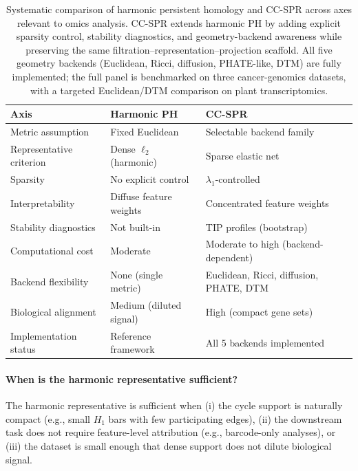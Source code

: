 \documentclass[11pt]{article}
\begin{document}
\begin{table}[h]
\centering
\small
\begin{tabular}{p{2.5cm}p{3.0cm}p{3.0cm}}
\toprule
\textbf{Axis} & \textbf{Harmonic PH} & \textbf{CC-SPR} \\
\midrule
Metric assumption & Fixed Euclidean & Selectable backend family \\
Representative criterion & Dense $\ell_2$ (harmonic) & Sparse elastic net \\
Sparsity & No explicit control & $\lambda_1$-controlled \\
Interpretability & Diffuse feature weights & Concentrated feature weights \\
Stability diagnostics & Not built-in & TIP profiles (bootstrap) \\
Computational cost & Moderate & Moderate to high (backend-dependent) \\
Backend flexibility & None (single metric) & Euclidean, Ricci, diffusion, PHATE, DTM \\
Biological alignment & Medium (diluted signal) & High (compact gene sets) \\
Implementation status & Reference framework & All 5 backends implemented \\
\bottomrule
\end{tabular}
\caption{Systematic comparison of harmonic persistent homology and CC-SPR across axes relevant to omics analysis.
CC-SPR extends harmonic PH by adding explicit sparsity control, stability diagnostics, and geometry-backend awareness while preserving the same filtration--representation--projection scaffold.
All five geometry backends (Euclidean, Ricci, diffusion, PHATE-like, DTM) are fully implemented; the full panel is benchmarked on three cancer-genomics datasets, with a targeted Euclidean/DTM comparison on plant transcriptomics.}
\label{tab:hphcompare}
\end{table}

\paragraph{When is the harmonic representative sufficient?}
The harmonic representative is sufficient when (i) the cycle support is naturally compact (e.g., small $H_1$ bars with few participating edges), (ii) the downstream task does not require feature-level attribution (e.g., barcode-only analyses), or (iii) the dataset is small enough that dense support does not dilute biological signal.
\end{document}
